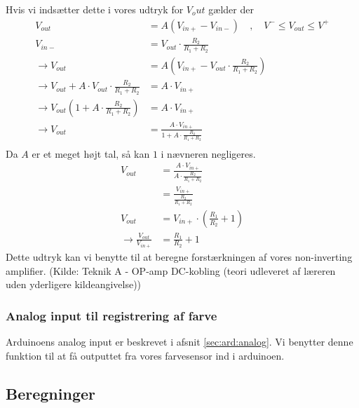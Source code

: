 Hvis vi indsætter dette i vores udtryk for $V_out$ gælder der
\begin{align}
V_{out}&=A(V_{in+}-V_{in-})\quad,\quad V^- \leq V_{out}\leq V^+\\
V_{in-}&=V_{out}\cdot \frac{R_2}{R_1+R_2}\\
\rightarrow V_{out}&= A(V_{in+}-V_{out}\cdot \frac{R_2}{R_1+R_2})\\
\rightarrow V_{out}+A\cdot V_{out}\cdot \frac{R_2}{R_1+R_2}&=A\cdot V_{in+}\\
\rightarrow V_{out}(1+A\cdot \frac{R_2}{R_1+R_2})&=A\cdot V_{in+}\\
\rightarrow V_{out}&=\frac{A\cdot V_{in+}}{1+A\cdot \frac{R_2}{R_1+R_2}}\\
\end{align}
Da $A$ er et meget højt tal, så kan $1$ i nævneren negligeres.
\begin{align}
V_{out}&=\frac{A\cdot V_{in+}}{A\cdot \frac{R_2}{R_1+R_2}}\\
&=\frac{V_{in+}}{\frac{R_2}{R_1+R_2}}\\
V_{out}&=V_{in+}\cdot(\frac{R_1}{R_2}+1)\\
\rightarrow \frac{V_{out}}{V_{in+}}&=\frac{R_1}{R_2}+1
\end{align}
Dette udtryk kan vi benytte til at beregne forstærkningen af vores non-inverting amplifier.
(Kilde: Teknik A - OP-amp DC-kobling (teori udleveret af læreren uden yderligere kildeangivelse))
\subsubsection{Analog input til registrering af farve}
Arduinoens analog input er beskrevet i afsnit \ref{sec:ard:analog}. Vi benytter denne funktion til at få outputtet fra vores farvesensor ind i arduinoen.
\subsection{Beregninger}
